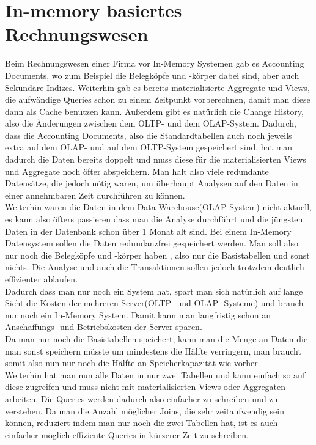 %
\section{In-memory basiertes Rechnungswesen}
Beim Rechnungswesen einer Firma vor In-Memory Systemen gab es Accounting Documents, wo zum Beispiel die Belegköpfe und -körper dabei sind, aber auch Sekundäre Indizes. Weiterhin gab es bereits materialisierte Aggregate und Views, die aufwändige Queries schon zu einem Zeitpunkt vorberechnen, damit man diese dann als Cache benutzen kann. Außerdem gibt es natürlich die Change History, also die Änderungen zwischen dem OLTP- und dem OLAP-System. Dadurch, dass die Accounting Documents, also die Standardtabellen auch noch jeweils extra auf dem OLAP- und auf dem OLTP-System gespeichert sind, hat man dadurch die Daten bereits doppelt und muss diese für die materialisierten Views und Aggregate noch öfter abspeichern. Man halt also viele redundante Datensätze, die jedoch nötig waren, um überhaupt Analysen auf den Daten in einer annehmbaren Zeit durchführen zu können.
\\
Weiterhin waren die Daten in dem Data Warehouse(OLAP-System) nicht aktuell, es kann also öfters passieren dass man die Analyse durchführt und die jüngsten Daten in der Datenbank schon über 1 Monat alt sind.
Bei einem In-Memory Datensystem sollen die Daten redundanzfrei gespeichert werden. Man soll also nur noch die Belegköpfe und -körper haben , also nur die Basistabellen und sonst nichts. Die Analyse und auch die Transaktionen sollen jedoch trotzdem deutlich effizienter ablaufen.
\\
Dadurch dass man nur noch ein System hat, spart man sich natürlich auf lange Sicht die Kosten der mehreren Server(OLTP- und OLAP- Systeme) und brauch nur noch ein In-Memory System. Damit kann man langfristig schon an Anschaffungs- und Betriebskosten der Server sparen.
\\
Da man nur noch die Basistabellen speichert, kann man die Menge an Daten die man sonst speichern müsste um mindestens die Hälfte verringern, man braucht somit also nun nur noch die Hälfte an Speicherkapazität wie vorher.
\\
Weiterhin hat man nun alle Daten in nur zwei Tabellen und kann einfach so auf diese zugreifen und muss nicht mit materialisierten Views oder Aggregaten arbeiten. Die Queries werden dadurch also einfacher zu schreiben und zu verstehen. Da man die Anzahl möglicher Joins, die sehr zeitaufwendig sein können, reduziert indem man nur noch die zwei Tabellen hat, ist es auch einfacher möglich effiziente Queries in kürzerer Zeit zu schreiben.
